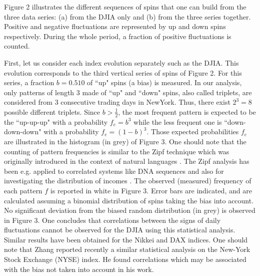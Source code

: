 \documentclass[12pt]{article}
\begin{document}
Figure 2 illustrates the different sequences of spins that one can build from the three data series: (a) from the DJIA only and (b) from the three series together. Positive and negative fluctuations are represented by up and down spins respectively. During the whole period, a fraction of positive fluctuations is counted.  

First, let us consider each index evolution separately such as the DJIA. This evolution corresponds to the third vertical series of spins of Figure 2. For this series, a fraction $b=0.510$ of ``up" spins (a bias) is measured. In our analysis, only patterns of length 3 made of ``up" and ``down" spins, also called triplets, are considered from 3 consecutive trading days in NewYork. Thus, there exist $2^3=8$ possible different triplets. Since $b>\frac{1}{2}$, the most frequent pattern is expected to be the ``up-up-up" with a probability $f_e = b^3$ while the less frequent one is ``down-down-down" with a probability $f_e = (1-b)^3$. Those expected probabilities $f_e$ are illustrated in the histogram (in grey) of Figure 3. One should note that the counting of pattern frequencies is similar to the Zipf technique which was originally introduced in the context of natural languages \cite{zipf}. The Zipf analysis has been e.g. applied to correlated systems like DNA sequences \cite{dna} and also for investigating the distribution of incomes \cite{incomes}. The observed (measured) frequency of each pattern $f$ is reported in white in Figure 3. Error bars are indicated, and are calculated assuming a binomial distribution of spins taking the bias into account. No significant deviation from the biased random distribution (in grey) is observed in Figure 3. One concludes that correlations between the signs of daily fluctuations cannot be observed for the DJIA using this statistical analysis. Similar results have been obtained for the Nikkei and DAX indices. One should note that Zhang \cite{zhang} reported recently a similar statistical analysis on the New-York Stock Exchange (NYSE) index. He found correlations which may be associated with the bias not taken into account in his work. 
\end{document}
